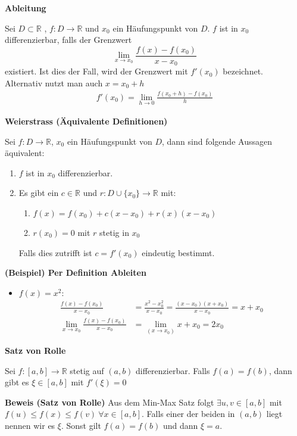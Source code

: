 \documentclass[25pt]{sciposter}
\newcommand{\R}{\mathbb{R}}
\newenvironment{method}[1]{\begin{mdframed}[backgroundcolor=blue!10,innertopmargin=15pt, innerbottommargin=15pt,nobreak=true]
		\textbf{#1 }
	}
	{ 
	\end{mdframed}
}
\begin{document}
\begin{multicols}{3}
\begin{method}{Ableitung}
	Sei $D \subset \R$ , $f:D \to  \R$ und $x_0$ ein Häufungspunkt von $D$. $f$ ist in $x_0$ differenzierbar, falls der Grenzwert 
	$$ \lim\limits_{x \to x_0} \frac{f(x) -f(x_0)}{x-x_0}$$
	existiert. Ist dies der Fall, wird der Grenzwert mit $f'(x_0)$ bezeichnet.\\
	Alternativ nutzt man auch $x = x_0 + h$
	\begin{align*}
			f'(x_0) = \lim\limits_{h \to 0} \frac{f(x_0 + h) - f(x_0)}{h}
	\end{align*}
\end{method}


\begin{method}{Weierstrass (Äquivalente Definitionen)}
Sei $f : D \to \R$, $x_0$ ein Häufungspunkt von $D$, dann sind folgende Aussagen äquivalent:
\begin{enumerate}
	\item $f$ ist in $x_0$ differenzierbar.
	\item Es gibt ein $c\in \R$ und $r : D \cup \{x_0\} \to \R$ mit:
	\begin{enumerate}
		\item $f(x) = f(x_0) + c(x-x_0) + r(x) (x-x_0)$
		\item $r(x_0) = 0$ mit $r$ stetig in $x_0$
	\end{enumerate}
Falls dies zutrifft ist $c=f'(x_0)$ eindeutig bestimmt.
\end{enumerate}
\end{method}

\textbf{(Beispiel) Per Definition Ableiten}

\begin{itemize}
	\item $f(x) = x^2$:
	\begin{align*}
		\frac{f(x) - f(x_0)}{x-x_0} &= 	\frac{x^2 - x_{0}^2}{x-x_0} = \frac{(x-x_0) (x+x_0)}{x-x_0} = x + x_0\\
		\lim_{x \to x_0} \frac{f(x)-f(x_0)}{x-x_0} &= \lim_{(x\to x_0)} x + x_0 = 2x_0
	\end{align*}
\end{itemize}



\begin{method}{Satz von Rolle}
	Sei $f: [a,b] \to \R$ stetig auf $(a,b)$ differenzierbar. Falls $f(a) = f(b)$, dann gibt es $\xi \in [a,b]$ mit $f'(\xi) = 0$
\end{method}
\textbf{Beweis (Satz von Rolle)} Aus dem Min-Max Satz folgt $\exists u,v \in [a,b]$ mit $f(u) \leq f(x) \leq f(v) \ \forall x \in [a,b]$. Falls einer der beiden in $(a,b)$ liegt nennen wir es $\xi$. Sonst gilt $f(a) = f(b)$ und dann $\xi = a$.



\end{multicols}
\end{document}
